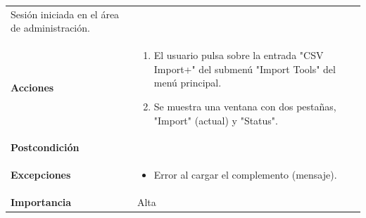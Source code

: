 \documentclass[
]{article}
\providecommand{\tightlist}{%
  \setlength{\itemsep}{0pt}\setlength{\parskip}{0pt}}
\begin{document}
\begin{longtable}[]{@{}ll@{}}
\begin{minipage}[t]{0.75\columnwidth}
Sesión iniciada en el área de administración.\strut
\end{minipage}\tabularnewline
\begin{minipage}[t]{0.20\columnwidth}\raggedright
\textbf{Acciones}\strut
\end{minipage} & \begin{minipage}[t]{0.75\columnwidth}\raggedright
\begin{enumerate}
\def\labelenumi{\arabic{enumi}.}
\tightlist
\item
  El usuario pulsa sobre la entrada "CSV Import+" del submenú "Import
  Tools" del menú principal.
\item
  Se muestra una ventana con dos pestañas, "Import" (actual) y "Status".
\end{enumerate}\strut
\end{minipage}\tabularnewline
\begin{minipage}[t]{0.20\columnwidth}\raggedright
\textbf{Postcondición}\strut
\end{minipage} & \begin{minipage}[t]{0.75\columnwidth}\raggedright
\strut
\end{minipage}\tabularnewline
\begin{minipage}[t]{0.20\columnwidth}\raggedright
\textbf{Excepciones}\strut
\end{minipage} & \begin{minipage}[t]{0.75\columnwidth}\raggedright
\begin{itemize}
\tightlist
\item
  Error al cargar el complemento (mensaje).
\end{itemize}\strut
\end{minipage}\tabularnewline
\begin{minipage}[t]{0.20\columnwidth}\raggedright
\textbf{Importancia}\strut
\end{minipage} & \begin{minipage}[t]{0.75\columnwidth}\raggedright
Alta\strut
\end{minipage}\tabularnewline
\bottomrule
\end{longtable}
\end{document}
